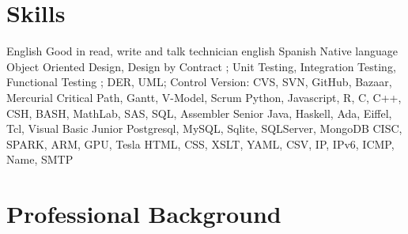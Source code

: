 \section{Skills}
        {English}
        {Good in read, write and talk technician english}
        {}
        {}
        {}
\cventry{}
        {Spanish}
        {Native language}
        {}
        {}
        {}
        {Object Oriented Design, Design by Contract ; Unit Testing, Integration Testing, Functional Testing ; DER, UML; Control Version: CVS, SVN, GitHub, Bazaar, Mercurial}
        {}
        {}
        {}
        {}
        {Critical Path, Gantt, V-Model, Scrum}
        {}
        {}
        {}
        {}
        {Python, Javascript, R, C, C++, CSH, BASH, MathLab, SAS, SQL, Assembler}
        {Senior}
        {}
        {}
        {}
\cventry{}
        {Java, Haskell, Ada, Eiffel, Tcl, Visual Basic}
        {Junior}
        {}
        {}
        {}
        {Postgresql, MySQL, Sqlite, SQLServer, MongoDB}
        {}
        {}
        {}
        {}
        {CISC, SPARK, ARM, GPU, Tesla}
        {}
        {}
        {}
        {}
        {HTML, CSS, XSLT, YAML, CSV, IP, IPv6, ICMP, Name, SMTP}
        {}
        {}
        {}
        {}

	\pagebreak[4]

\section{Professional Background}\label{profesional:desde}

